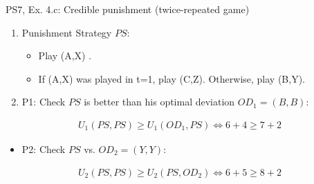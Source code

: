 \begin{frame}{PS7, Ex. 4.c: Credible punishment (twice-repeated game)}
\begin{multicols}{2}
\begin{enumerate}
        \item[b.] Punishment Strategy $PS$:
        \begin{itemize}\normalsize
          \item[t=1:] Play (A,X) .
          \item[t=2:] If (A,X) was played in t=1, play (C,Z). Otherwise, play (B,Y).
        \end{itemize}
        \item[c.] P1: Check $PS$ is better than his optimal deviation $OD_1=(B,B)$:
      \end{enumerate}
      \vspace{-14pt}
      \begin{align*}
          U_1(PS,PS)\geq U_1(OD_1,PS)\Leftrightarrow6+4\geq7+2%
      \end{align*}
      \vspace{-22pt}
      \begin{itemize}
          \item[c.] P2: Check $PS$ vs. $OD_2=(Y,Y)$:
      \end{itemize}
      \vspace{-14pt}
      \begin{align*}
          U_2(PS,PS)\geq U_2(PS,OD_2)\Leftrightarrow6+5\geq8+2%
      \end{align*}
      \vspace{-22pt}
      \vfill\null
    \end{multicols}
\end{frame}
